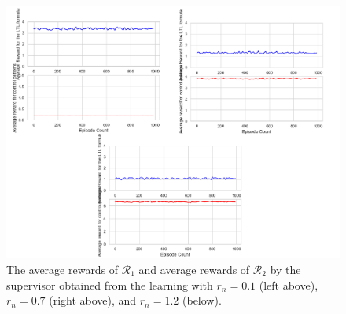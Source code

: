 \begin{figure}[H] %
   \centering
   \vspace{2mm}
   \includegraphics[width = 12cm]{simulate_TD_v_15000_5000_rn_all_rsink_1000.png}
   \caption{The average rewards of $\mathcal{R}_1$ and average rewards of $\mathcal{R}_2$ by the supervisor obtained from the learning with $r_{n} = 0.1$ (left above), $r_n = 0.7$ (right above), and $r_n = 1.2$ (below).}
   \label{sim1}
\end{figure}
